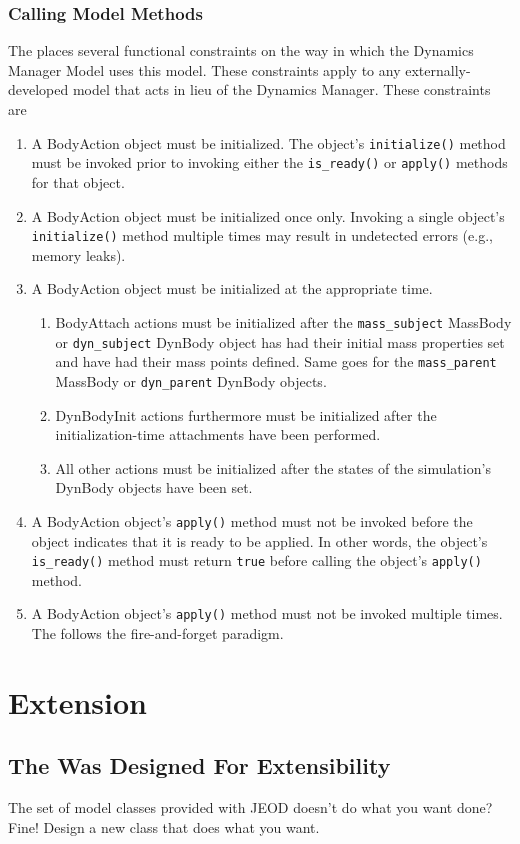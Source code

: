\subsubsection{Calling Model Methods}
The \ModelDesc places several functional constraints on the way in
which the Dynamics Manager Model uses this model.
These constraints apply to any externally-developed model that
acts in lieu of the Dynamics Manager. These constraints are
\begin{enumerate}
\item A BodyAction object must be initialized.
The object's {\tt initialize()} method must be invoked prior to invoking
either the {\tt is\_ready()} or {\tt apply()} methods for that object.
\item A BodyAction object must be initialized once only.
Invoking a single object's {\tt initialize()} method multiple times may
result in undetected errors (e.g., memory leaks).
\item A BodyAction object must be initialized at the appropriate time.
\begin{enumerate}
\item BodyAttach actions must be initialized
after the {\tt mass\_subject} MassBody or {\tt dyn\_subject} DynBody object has had their initial mass properties set
and have had their mass points defined.
Same goes for the {\tt mass\_parent} MassBody or {\tt dyn\_parent} DynBody objects.
\item  DynBodyInit actions furthermore must be initialized after
the initialization-time attachments have been performed.
\item All other actions must be initialized after the states of the
simulation's DynBody objects have been set.
\end{enumerate}
\item A BodyAction object's {\tt apply()} method must not be invoked
before the object indicates that it is ready to be applied. In other words,
the object's {\tt is\_ready()} method must return {\tt true} before
calling the object's {\tt apply()} method.
\item A BodyAction object's {\tt apply()} method must not be invoked
multiple times. The \ModelDesc follows the fire-and-forget paradigm.
\end{enumerate}


\section{Extension}
\subsection{The \ModelDesc Was Designed For Extensibility}
The set of model classes provided with JEOD doesn't do what you want done?
Fine! Design a new class that does what you want.

